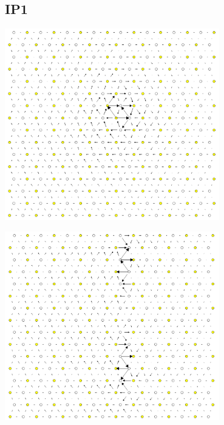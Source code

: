 \documentclass[11pt]{article}
\begin{document}
\subsection{IP1}
\label{sec:orga14152e}
\begin{center}
\includegraphics[width=0.7\textwidth]{Images/final_model_IP1_partial_dd_initial.png}
\end{center}
\begin{center}
\includegraphics[width=0.7\textwidth]{Images/final_model_IP1_partial_dd_final.png}
\end{center} 
\end{document}
